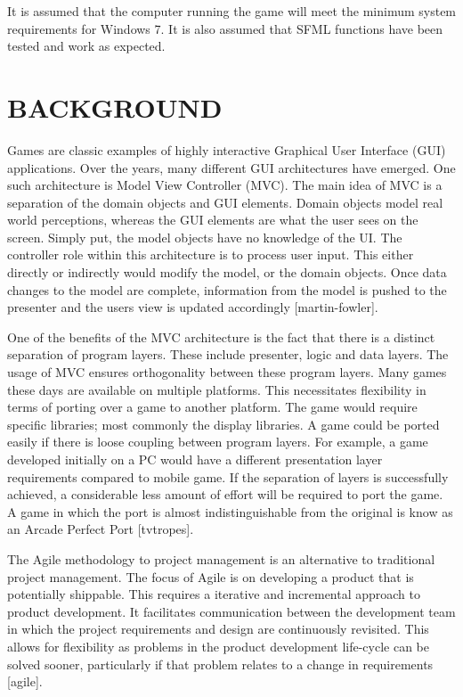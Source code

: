 \documentclass[10pt,twocolumn]{witseiepaper}
\begin{document}
It is assumed that the computer running the game will meet the minimum system requirements for Windows 7. It is also assumed that SFML functions have been tested and work as expected.

%
\section{BACKGROUND} %
Games are classic examples of highly interactive Graphical User Interface (GUI) applications. Over the years, many different GUI architectures have emerged. One such architecture is Model View Controller (MVC). The main idea of MVC is a separation of the domain objects and GUI elements. Domain objects model real world perceptions, whereas the GUI elements are what the user sees on the screen. Simply put, the model objects have no knowledge of the UI. The controller role within this architecture is to process user input. This either directly or indirectly would modify the model, or the domain objects. Once data changes to the model are complete, information from the model is pushed to the presenter and the users view is updated accordingly [martin-fowler].

One of the benefits of the MVC architecture is the fact that there is a distinct separation of program layers. These include presenter, logic and data layers. The usage of MVC ensures orthogonality between these program layers. Many games these days are available on multiple platforms. This necessitates flexibility in terms of porting over a game to another platform. The game would require specific libraries; most commonly the display libraries. A game could be ported easily if there is loose coupling between program layers. For example, a game developed initially on a PC would have a different presentation layer requirements compared to mobile game. If the separation of layers is successfully achieved, a considerable less amount of effort will be required to port the game. A game in which the port is almost indistinguishable from the original is know as an Arcade Perfect Port [tvtropes].

The Agile methodology to project management is an alternative to traditional project management. The focus of Agile is on developing a product that is potentially shippable. This requires a iterative and incremental approach to product development. It facilitates communication between the development team in which the project requirements and design are continuously revisited. This allows for flexibility as problems in the product development life-cycle can be solved sooner, particularly if that problem relates to a change in requirements [agile].
\end{document}
